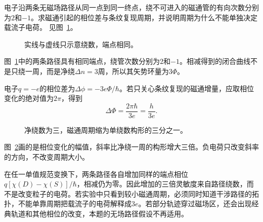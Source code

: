 \begin{exercise}[干涉路径的绕数]\label{ex:i1-h8}
电子沿两条无磁场路径从同一点到同一终点，绕不可进入的磁通管的有向次数分别为$2$和$-1$。求磁通引起的相位差与条纹复现周期，并说明周期为什么不能单独决定载流子电荷。 见图~\ref{fig:i1-h8-q}。
\end{exercise}

\begin{figure}[H]\centering
{}
\caption{实线与虚线只示意绕数，端点相同。}\label{fig:i1-h8-q}
\end{figure}
\begin{solution}
图~\ref{fig:i1-h8-q}中的两条路径具有相同端点，绕管次数分别为$2$和$-1$。相减得到的闭合曲线不是只绕一周，而是净绕$\Delta n=3$周，所以其矢势环量为$3\Phi$。

电子$q=-e$的相位差为$\Delta\phi=-3e\Phi/\hbar$。若只关心条纹复现的磁通增量，应取相位变化的绝对值为$2\pi$，得到
\[\boxed{\Delta\Phi=\frac{2\pi\hbar}{3e}=\frac h{3e}}.
\]

\begin{figure}[H]\centering
{}
\caption{净绕数为三，磁通周期缩为单绕数构形的三分之一。}\label{fig:i1-h8-s}
\end{figure}

图~\ref{fig:i1-h8-s}画的是相位变化的幅值，斜率比净绕一周的构形增大三倍。负电荷只改变斜率的方向，不改变周期大小。

在任一单值规范变换下，两条路径各自增加同样的端点相位$q[\chi(D)-\chi(S)]/\hbar$，相减仍为零。因此增加的三倍灵敏度来自路径绕数，而不是改变粒子的电荷。若实验中只看到较小磁通周期，必须同时知道干涉路径的拓扑，不能单靠周期把载流子的电荷解释成$3e$。若部分轨迹穿过磁场区，还会出现经典轨道和其他相位的改变，本题的无场路径假设不再适用。
\end{solution}


